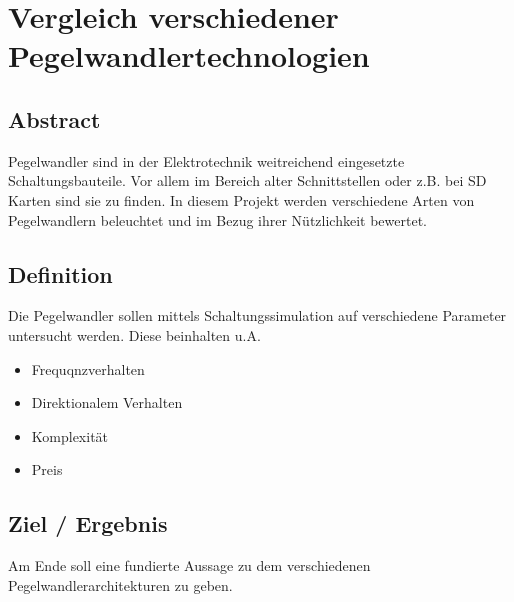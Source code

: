 \section{Vergleich verschiedener Pegelwandlertechnologien 
}\label{sec:proj-title-long}

\subsection{Abstract
}\label{subsec:proj-abstract}

Pegelwandler sind in der Elektrotechnik weitreichend eingesetzte Schaltungsbauteile.
Vor allem im Bereich alter Schnittstellen oder z.B. bei SD Karten sind sie zu finden.
In diesem Projekt werden verschiedene Arten von Pegelwandlern beleuchtet und im Bezug ihrer Nützlichkeit bewertet.

\subsection{Definition
}\label{subsec:proj-def}

Die Pegelwandler sollen mittels Schaltungssimulation auf verschiedene Parameter untersucht werden.
Diese beinhalten u.A. 
\begin{itemize}
  \item Frequqnzverhalten
  \item Direktionalem Verhalten
  \item Komplexität
  \item Preis
\end{itemize}

\subsection{Ziel / Ergebnis
}\label{subsec:proj-target}

Am Ende soll eine fundierte Aussage zu dem verschiedenen Pegelwandlerarchitekturen zu geben.


